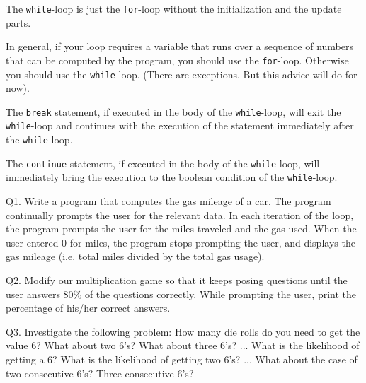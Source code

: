 The \texttt{while}-loop is just the \texttt{for}-loop without the
initialization and the update parts.

In general, if your loop requires a variable that runs over a sequence
of numbers that can be computed by the program, you should use the
\texttt{for}-loop. Otherwise you should use the \texttt{while}-loop. (There
are exceptions. But this advice will do for now).

The \texttt{break} statement, if executed in the body of the
\texttt{while}-loop, will exit the \texttt{while}-loop and continues with
the execution of the statement immediately after the \texttt{while}-loop.

The \texttt{continue} statement, if executed in the body of the
\texttt{while}-loop, will immediately bring the execution to the boolean
condition of the \texttt{while}-loop.

\newpage{}


Q1. Write a program that computes the gas mileage of a car. The program
continually prompts the user for the relevant data. In each iteration of
the loop, the program prompts the user for the miles traveled and the
gas used. When the user entered 0 for miles, the program stops prompting
the user, and displays the gas mileage (i.e. total miles divided by the
total gas usage).

Q2. Modify our multiplication game so that it keeps posing questions
until the user answers 80\% of the questions correctly. While prompting
the user, print the percentage of his/her correct answers.

Q3. Investigate the following problem: How many die rolls do you need to
get the value 6? What about two 6's? What about three
6's? ... What is the likelihood of getting a 6? What is
the likelihood of getting two 6's? ... What about the
case of two consecutive 6's? Three consecutive
6's?
